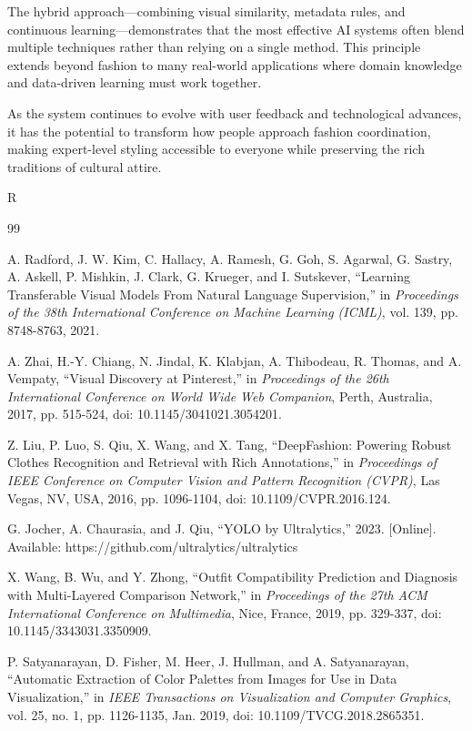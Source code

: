\documentclass[12pt,a4paper]{report}
\begin{document}
The hybrid approach—combining visual similarity, metadata rules, and continuous learning—demonstrates that the most effective AI systems often blend multiple techniques rather than relying on a single method. This principle extends beyond fashion to many real-world applications where domain knowledge and data-driven learning must work together.

As the system continues to evolve with user feedback and technological advances, it has the potential to transform how people approach fashion coordination, making expert-level styling accessible to everyone while preserving the rich traditions of cultural attire.

\renewcommand{\bibname}{REFERENCES}
R\begin{thebibliography}{99}

A. Radford, J. W. Kim, C. Hallacy, A. Ramesh, G. Goh, S. Agarwal, G. Sastry, A. Askell, P. Mishkin, J. Clark, G. Krueger, and I. Sutskever, ``Learning Transferable Visual Models From Natural Language Supervision,'' in \textit{Proceedings of the 38th International Conference on Machine Learning (ICML)}, vol. 139, pp. 8748-8763, 2021.

A. Zhai, H.-Y. Chiang, N. Jindal, K. Klabjan, A. Thibodeau, R. Thomas, and A. Vempaty, ``Visual Discovery at Pinterest,'' in \textit{Proceedings of the 26th International Conference on World Wide Web Companion}, Perth, Australia, 2017, pp. 515-524, doi: 10.1145/3041021.3054201.

Z. Liu, P. Luo, S. Qiu, X. Wang, and X. Tang, ``DeepFashion: Powering Robust Clothes Recognition and Retrieval with Rich Annotations,'' in \textit{Proceedings of IEEE Conference on Computer Vision and Pattern Recognition (CVPR)}, Las Vegas, NV, USA, 2016, pp. 1096-1104, doi: 10.1109/CVPR.2016.124.

G. Jocher, A. Chaurasia, and J. Qiu, ``YOLO by Ultralytics,'' 2023. [Online]. Available: https://github.com/ultralytics/ultralytics

X. Wang, B. Wu, and Y. Zhong, ``Outfit Compatibility Prediction and Diagnosis with Multi-Layered Comparison Network,'' in \textit{Proceedings of the 27th ACM International Conference on Multimedia}, Nice, France, 2019, pp. 329-337, doi: 10.1145/3343031.3350909.

P. Satyanarayan, D. Fisher, M. Heer, J. Hullman, and A. Satyanarayan, ``Automatic Extraction of Color Palettes from Images for Use in Data Visualization,'' in \textit{IEEE Transactions on Visualization and Computer Graphics}, vol. 25, no. 1, pp. 1126-1135, Jan. 2019, doi: 10.1109/TVCG.2018.2865351.


\end{thebibliography}
\end{document}
